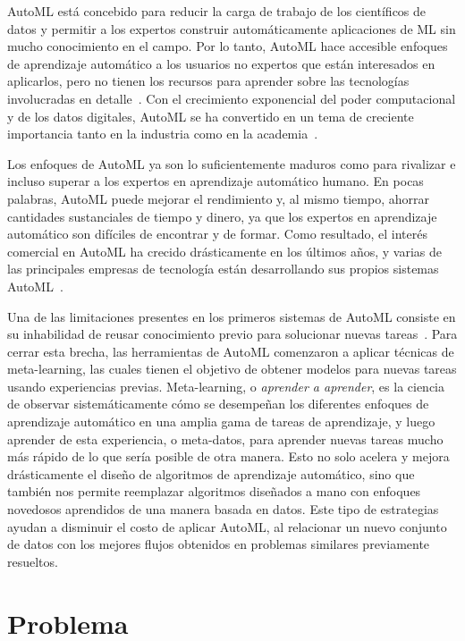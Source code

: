 AutoML está concebido para reducir la carga de trabajo de los científicos de datos y permitir a los expertos construir automáticamente aplicaciones de ML sin mucho conocimiento en el campo. Por lo tanto, AutoML hace accesible enfoques de aprendizaje automático a los usuarios no expertos que están interesados en aplicarlos, pero no tienen los recursos para aprender sobre las tecnologías involucradas en detalle~\cite{hutter2019autmlbook}. Con el crecimiento exponencial del poder computacional y de los datos digitales, AutoML se ha convertido en un tema de creciente importancia tanto en la industria como en la academia~\cite{he2021automl}. 

Los enfoques de AutoML ya son lo suficientemente maduros como para
rivalizar e incluso superar a los expertos en aprendizaje automático humano. En pocas palabras, AutoML puede mejorar el rendimiento y, al mismo tiempo, ahorrar cantidades sustanciales de tiempo y dinero, ya que los expertos en aprendizaje automático son difíciles de encontrar y de formar. Como resultado, el interés comercial en AutoML ha crecido drásticamente en los últimos años, y varias de las principales empresas de tecnología están desarrollando sus propios sistemas AutoML~\cite{hutter2019autmlbook}.

Una de las limitaciones presentes en los primeros sistemas de AutoML consiste en su inhabilidad de reusar conocimiento previo para solucionar nuevas tareas~\cite{dyrmishi2019decision}. Para cerrar esta brecha, las herramientas de AutoML comenzaron a aplicar técnicas de meta-learning, las cuales tienen el objetivo de obtener modelos para nuevas tareas usando experiencias previas. Meta-learning, o \textit{aprender a aprender}, es la ciencia de observar sistemáticamente cómo se desempeñan los diferentes enfoques de aprendizaje automático en una amplia gama de tareas de aprendizaje, y luego aprender de esta experiencia, o meta-datos, para aprender nuevas tareas mucho más rápido de lo que sería posible de otra manera. Esto no solo acelera y mejora drásticamente el diseño de algoritmos de aprendizaje automático, sino que también nos permite reemplazar algoritmos diseñados a mano con enfoques novedosos aprendidos de una manera basada en datos. Este tipo de estrategias ayudan a disminuir el costo de aplicar AutoML, al relacionar un nuevo conjunto de datos con los mejores flujos obtenidos en problemas similares previamente resueltos. 

\section*{Problema}


